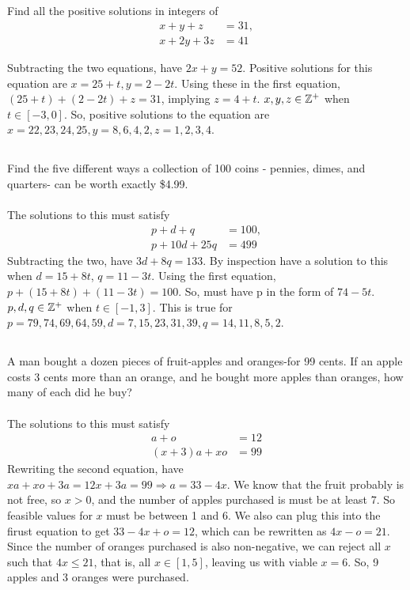 \documentclass{article}
\begin{document}
\subsection{}
Find all the positive solutions in integers of
\begin{align}
    x + y + z &= 31,\\
    x + 2y + 3z &= 41
\end{align}

Subtracting the two equations, have $2x + y = 52$.
Positive solutions for this equation are $x = 25 + t, y = 2 - 2t$.
Using these in the first equation, $(25 + t) + (2 - 2t) + z = 31$,
implying $z = 4 + t$.
$x, y, z \in \mathbb{Z}^+$ when $t \in [-3, 0]$.
So, positive solutions to the equation are
$x = 22, 23, 24, 25, y = 8, 6, 4, 2, z = 1, 2, 3, 4$.

\subsection{}
Find the five different ways a collection of 100 coins - pennies, dimes, and
quarters- can be worth exactly \$4.99.\\~\\
The solutions to this must satisfy
\begin{align}
    p + d + q &= 100,\\
    p + 10d + 25q &= 499
\end{align}
Subtracting the two, have $3d + 8q = 133$.
By inspection have a solution to this when $d = 15 + 8t$, $q = 11 - 3t$.
Using the first equation, $p + (15 + 8t) + (11 - 3t) = 100$.
So, must have p in the form of $74 - 5t$.
$p, d, q \in \mathbb{Z}^+$ when $t \in [-1, 3]$.
This is true for $p = 79, 74, 69, 64, 59, d = 7, 15, 23, 31, 39, q = 14, 11, 8, 5, 2$.


\subsection{}
A man bought a dozen pieces of fruit-apples and oranges-for 99 cents.
If an apple costs 3 cents more than an orange, and he bought more apples
than oranges, how many of each did he buy?\\~\\
The solutions to this must satisfy
\begin{align}
    a + o &= 12\\
    (x + 3)a + xo &= 99
\end{align}
Rewriting the second equation, have $xa + xo + 3a = 12x + 3a = 99 \Rightarrow a = 33 - 4x$.
We know that the fruit probably is not free, so $x > 0$, and the number of apples
purchased is must be at least 7.
So feasible values for $x$ must be between 1 and 6.
We also can plug this into the firust equation to get $33 - 4x + o = 12$,
which can be rewritten as $4x - o = 21$.
Since the number of oranges purchased is also non-negative, we can reject all $x$
such that $4x \leq 21$, that is, all $x \in [1, 5]$,
leaving us with viable $x = 6$. So, 9 apples and 3 oranges were purchased.
\end{document}
